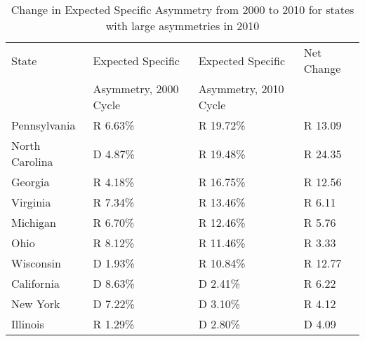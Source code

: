 \begin{table}[htb!]
\centering
\caption{Change in Expected Specific Asymmetry from 2000 to 2010 for states with large asymmetries in 2010 \label{tab:Asym2000to2010}}
\begin{tabular}{|l|l|l|l|}
\hline
State & Expected Specific     & Expected Specific & Net Change\\
      & Asymmetry, 2000 Cycle & Asymmetry, 2010 Cycle & \\
\hline
\hline
Pennsylvania & R 6.63\% & R 19.72\% & R 13.09\\
\hline
North Carolina & D 4.87\% & R 19.48\% & R 24.35\\
\hline
Georgia & R 4.18\% & R 16.75\% & R 12.56\\
\hline
Virginia & R 7.34\% & R 13.46\% & R 6.11\\
\hline
Michigan & R 6.70\% & R 12.46\% & R 5.76\\
\hline
Ohio & R 8.12\% & R 11.46\% & R 3.33\\
\hline
Wisconsin & D 1.93\% & R 10.84\% & R 12.77\\
\hline
California & D 8.63\% & D 2.41\% & R 6.22\\
\hline
New York & D 7.22\% & D 3.10\% & R 4.12\\
\hline
Illinois & R 1.29\% & D 2.80\% & D 4.09\\
\hline
\end{tabular}
\end{table}
